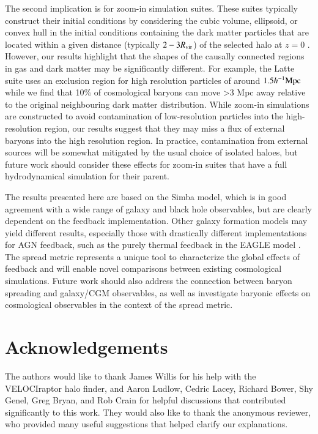 \documentclass[fleqn,usenatbib]{mnras}
\newcommand{\hmpc}{h^{-1}{\rm Mpc}}
\newcommand{\simba}{{\sc Simba}}
\newcommand{\velociraptor}{{\sc VELOCIraptor}}
\begin{document}
The second implication is for zoom-in simulation suites. These suites
typically construct their initial conditions by considering the cubic volume,
ellipsoid, or convex hull in the initial conditions containing the dark
matter particles that are located within a given distance (typically
$2-3R_{\rm vir}$) of the selected halo at $z=0$ \citep[see e.g.][]{Onorbe2014}.
However, our results highlight that the shapes of the
causally connected regions in gas and dark matter may be significantly
different. For example, the Latte \citep{Wetzel2016} suite uses an exclusion
region for high resolution particles of around $1.5 \hmpc{}$ while we find
that 10\% of cosmological baryons can move >3 Mpc away relative to the
original neighbouring dark matter distribution. While zoom-in simulations are
constructed to avoid contamination of low-resolution particles into the
high-resolution region, our results suggest that they may miss a flux of
external baryons into the high resolution region. In practice, contamination
from external sources will be somewhat mitigated by the usual choice of
isolated haloes, but future work should consider these effects for zoom-in
suites that have a full hydrodynamical simulation for their parent.


The results presented here are based on the \simba{} model, which is in good
agreement with a wide range of galaxy \citep{Dave2019} and black hole
\citep{Thomas2019} observables, but are clearly dependent on the feedback
implementation. Other galaxy formation models may yield different results,
especially those with drastically different implementations for AGN feedback,
such as the purely thermal feedback in the EAGLE model
\citep{Schaye2015}. The spread metric represents a unique tool to
characterize the global effects of feedback and will enable novel comparisons
between existing cosmological simulations. Future work should also address
the connection between baryon spreading and galaxy/CGM observables, as well
as investigate baryonic effects on cosmological observables
\citep{Schneider2015, Chisari2018} in the context of the spread metric.
 \section{Acknowledgements}
\label{sec:acknowledgements}

The authors would like to thank James Willis for his help with the
\velociraptor{} halo finder, and Aaron Ludlow, Cedric Lacey, Richard Bower,
Shy Genel, Greg Bryan, and Rob Crain for helpful discussions that contributed
significantly to this work. They would also like to thank the anonymous
reviewer, who provided many useful suggestions that helped clarify our
explanations.
\end{document}
